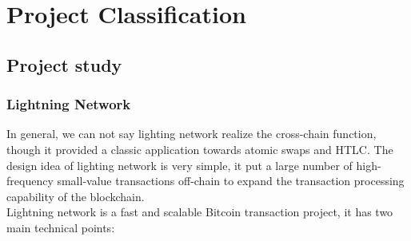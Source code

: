 \chapter{Project Classification} 
\label{chap:3}

  



\section{Project study}
\label{sec:p}

\subsection{Lightning Network}
\noindent In general, we can not say lighting network realize the cross-chain function, though it provided a classic application towards atomic swaps and HTLC. The design idea of lighting network is very simple, it put a large number of high-frequency small-value transactions off-chain to expand the transaction processing capability of the blockchain.\\
\noindent Lightning network\cite{poon2016bitcoin} is a fast and scalable Bitcoin transaction project, it has two main technical points:
